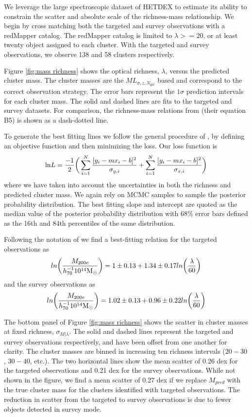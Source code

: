 \documentclass[fleqn,usenatbib]{mnras}
\begin{document}
We leverage the large spectroscopic dataset of HETDEX to estimate its ability to constrain the scatter and absolute scale of the richness-mass relationship. We begin by cross matching both the targeted and survey observations with a redMapper catalog. The redMapper catalog is limited to $\lambda >= 20$, or at least twenty object assigned to each cluster. With the targeted and survey observations, we observe 138 and 58 clusters respectively. 

Figure \ref{fig:mass richness} shows the optical richness, $\lambda$, versus the predicted cluster mass. The cluster masses are the $ML_{\sigma, z, N_{gal}}$ based and correspond to the correct observation strategy. The error bars represent the $1\sigma$ prediction intervals for each cluster mass. The solid and dashed lines are fits to the targeted and survey datasets. For comparison, the richness-mass relations from \cite{Rykoff2012} (their equation B5) is shown as a dash-dotted line.

To generate the best fitting lines we follow the general procedure of \cite{Hogg2010}, by defining an objective function and then minimizing the loss. Our loss function is
\begin{equation}
	\mathrm{ln}L= \frac{-1}{2} \bigg{(} \sum^N_{i=1}\frac{[y_i - mx_i - b]^2}{\sigma_{y,i}} + \sum^N_{i=1}\frac{[y_i - mx_i - b]^2}{\sigma_{x,i}} \bigg{)}
\end{equation} 
where we have taken into account the uncertainties in both the richness and predicted cluster mass. We again rely on MCMC samples to sample the posterior probability distribution. The best fitting slope and intercept are quoted as the median value of the posterior probability distribution with 68\% error bars defined as the 16th and 84th percentiles of the same distribution.

Following the notation of \cite{Rykoff2012} we find a best-fitting relation for the targeted observations as
\begin{equation}
	ln\bigg{(}\frac{M_{200c}}{h_{70}^{-1} 10^{14}\hbox{$\mathrm{M}_\odot$}}\bigg{)} = 1\pm0.13 + 1.34\pm0.17 ln\bigg{(}\frac{\lambda}{60}\bigg{)} \nonumber
\end{equation}
and the survey observations as
\begin{equation}
	ln\bigg{(}\frac{M_{200c}}{h_{70}^{-1} 10^{14}\hbox{$\mathrm{M}_\odot$}}\bigg{)} = 1.02\pm0.13 + 0.96\pm0.22 ln\bigg{(}\frac{\lambda}{60}\bigg{)} \nonumber
\end{equation}

The bottom panel of Figure \ref{fig:mass richness} shows the scatter in cluster masses at fixed richness, $\sigma_{M|\lambda}$. The solid and dashed lines represent the targeted and survey observations respectively, and have been offset from one another for clarity. The cluster masses are binned in increasing ten richness intervals ($20-30$, $30-40$, etc.). The two horizontal lines show the mean scatter of 0.26 dex for the targeted observations and 0.21 dex for the survey observations. While not shown in the figure, we find a mean scatter of 0.27 dex if we replace $M_{pred}$ with the true cluster mass for the clusters identified with targeted observations. The reduction in scatter from the targeted to survey observations is due to fewer objects detected in survey mode.
\end{document}
